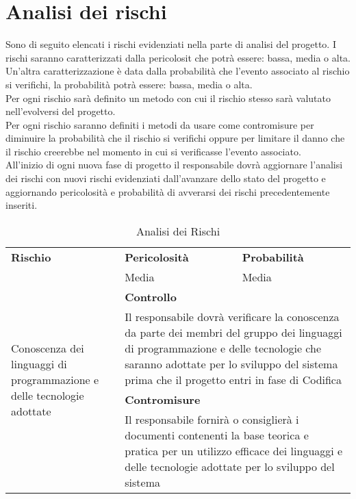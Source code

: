 \section{Analisi dei rischi}{
Sono di seguito elencati i rischi evidenziati nella parte di analisi del progetto. 
I rischi saranno caratterizzati dalla pericolosit che potrà essere: bassa, media o alta.
Un'altra caratterizzazione è data dalla probabilità che l'evento associato al rischio si verifichi, la probabilità potrà essere: bassa, media o alta.\\
Per ogni rischio sarà definito un metodo con cui il rischio stesso sarà valutato nell'evolversi del progetto.\\
Per ogni rischio saranno definiti i metodi da usare come contromisure per diminuire la probabilità che il rischio si verifichi oppure per limitare il danno che il rischio creerebbe nel momento in cui si verificasse l'evento associato.\\
All'inizio di ogni nuova fase di progetto il responsabile dovrà aggiornare l'analisi dei rischi con nuovi rischi evidenziati dall'avanzare dello stato del progetto e aggiornando pericolosità e probabilità di avverarsi dei rischi precedentemente inseriti.

	\begin{table}[H]
		\centering
		\begin{tabularx}{\textwidth}{p{}|p{}p{}}
				\hline
			   \textbf{Rischio} & \textbf{Pericolosità} & \textbf{Probabilità} \\
			   \multirow{5}{3cm}{Conoscenza dei linguaggi di programmazione e delle tecnologie adottate} & Media & Media\\
			   & \multicolumn{2}{p{0.7\textwidth}}{\textbf{Controllo}} \\
			   & \multicolumn{2}{p{0.7\textwidth}}{Il responsabile dovrà verificare la conoscenza da parte dei membri del gruppo dei linguaggi di programmazione e delle tecnologie che saranno adottate per lo sviluppo del sistema prima che il progetto entri in fase di Codifica} \\
			   & \multicolumn{2}{p{0.7\textwidth}}{\textbf{Contromisure}}\\
			   & \multicolumn{2}{p{0.7\textwidth}}{Il responsabile fornirà o consiglierà i documenti contenenti la base teorica e pratica per un utilizzo efficace dei linguaggi e delle tecnologie adottate per lo sviluppo del sistema} \\
			   \hline
		 \end{tabularx}
		 	\label{tab:analisirischi}
		 	\caption{Analisi dei Rischi}
		\end{table}
}

